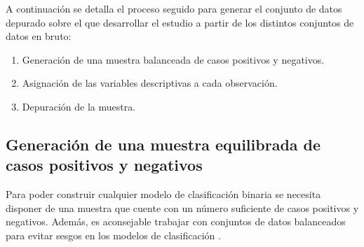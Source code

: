 \documentclass[12pt,a4paper,]{book}
\providecommand{\tightlist}{%
  \setlength{\itemsep}{0pt}\setlength{\parskip}{0pt}}
\numberwithin{dummy}{section}
\theoremstyle{ocrenumbox}
\theoremstyle{blacknumex}
\theoremstyle{blacknumbox}
\theoremstyle{ocrenum}
\theoremstyle{ocrenum}
\begin{document}
A continuación se detalla el proceso seguido para generar el conjunto de
datos depurado sobre el que desarrollar el estudio a partir de los
distintos conjuntos de datos en bruto:

\begin{enumerate}
\def\labelenumi{\arabic{enumi}.}
\tightlist
\item
  Generación de una muestra balanceada de casos positivos y negativos.
\item
  Asignación de las variables descriptivas a cada observación.
\item
  Depuración de la muestra.
\end{enumerate}

\hypertarget{generaciuxf3n-de-una-muestra-equilibrada-de-casos-positivos-y-negativos}{%
\subsection{Generación de una muestra equilibrada de casos positivos y
negativos}\label{generaciuxf3n-de-una-muestra-equilibrada-de-casos-positivos-y-negativos}}

Para poder construir cualquier modelo de clasificación binaria se
necesita disponer de una muestra que cuente con un número suficiente de
casos positivos y negativos. Además, es aconsejable trabajar con
conjuntos de datos balanceados para evitar sesgos en los modelos de
clasificación \citep{THABTAH2020429}.
\end{document}
